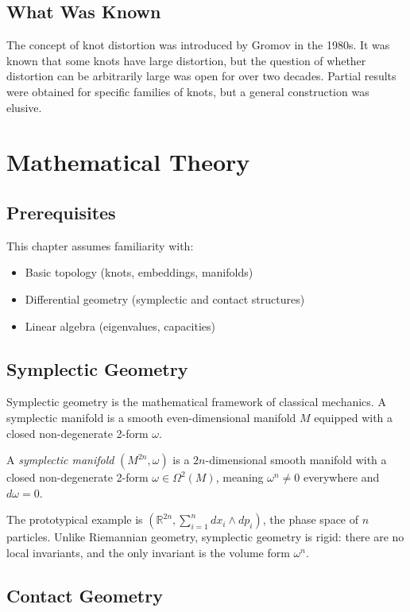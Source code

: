 \subsection{What Was Known}
The concept of knot distortion was introduced by Gromov in the 1980s. It was known that some knots have large distortion, but the question of whether distortion can be arbitrarily large was open for over two decades. Partial results were obtained for specific families of knots, but a general construction was elusive.

\section{Mathematical Theory}

\subsection{Prerequisites}
This chapter assumes familiarity with:
\begin{itemize}
\item Basic topology (knots, embeddings, manifolds)
\item Differential geometry (symplectic and contact structures)
\item Linear algebra (eigenvalues, capacities)
\end{itemize}

\subsection{Symplectic Geometry}

Symplectic geometry is the mathematical framework of classical mechanics. A symplectic manifold is a smooth even-dimensional manifold $M$ equipped with a closed non-degenerate 2-form $\omega$.

\begin{definition}
A \emph{symplectic manifold} $(M^{2n}, \omega)$ is a $2n$-dimensional smooth manifold with a closed non-degenerate 2-form $\omega \in \Omega^2(M)$, meaning $\omega^n \neq 0$ everywhere and $d\omega = 0$.
\end{definition}

The prototypical example is $(\mathbb{R}^{2n}, \sum_{i=1}^{n} dx_i \wedge dp_i)$, the phase space of $n$ particles. Unlike Riemannian geometry, symplectic geometry is rigid: there are no local invariants, and the only invariant is the volume form $\omega^n$.

\subsection{Contact Geometry}

